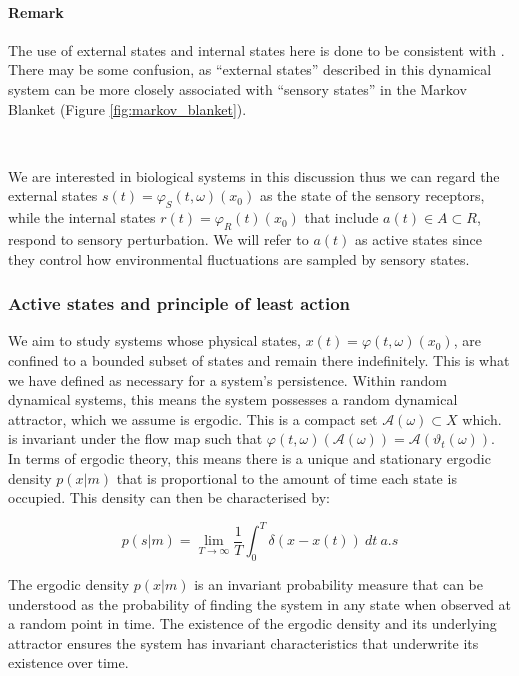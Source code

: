\documentclass{article}
\begin{document}
\paragraph{Remark} The use of external states and internal states here is done to be consistent with \citet{friston2012active}. There may be some confusion, as ``external states'' described in this dynamical system can be more closely associated with ``sensory states'' in the Markov Blanket (Figure \ref{fig:markov_blanket}).

\

We are interested in biological systems in this discussion thus we can regard the external states $s(t) = \varphi_S(t, \omega)(x_0)$ as the state of the sensory receptors, while the internal states $r(t) = \varphi_R(t)(x_0)$ that include $a(t) \in A \subset R$, respond to sensory perturbation. We will refer to $a(t)$ as active states since they control how environmental fluctuations are sampled by sensory states.

\subsubsection{Active states and principle of least action}

We aim to study systems whose physical states, $x(t) = \varphi(t, \omega)(x_0)$, are confined to a bounded subset of states and remain there indefinitely. This is what we have defined as necessary for a system's persistence. Within random dynamical systems, this means the system possesses a random dynamical attractor, which we assume is ergodic. This is a compact set $\mathcal{A}(\omega) \subset X$ which. is invariant under the flow map such that  $\varphi(t, \omega)(\mathcal{A}(\omega)) = \mathcal{A}(\vartheta_t(\omega))$. In terms of ergodic theory, this means there is a unique and stationary ergodic density $p(x | m)$ that is proportional to the amount of time each state is occupied. This density can then be characterised by:

\begin{equation}\label{eq:ergodic_density}
	p(s | m ) = \lim_{T \to \infty} \frac{1}{T} \int^T_0 \delta( x - x(t)) \ dt \ a.s
\end{equation}

The ergodic density $p(x | m)$ is an invariant probability measure that can be understood as the  probability of finding the system in any state when observed at a random point in time. The existence of the ergodic density and its underlying attractor ensures the system has invariant characteristics that underwrite its existence over time. 
\end{document}
